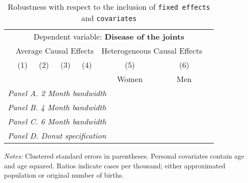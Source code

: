 \begin{table}[H] \begin{threeparttable} \centering \caption{Robustness with respect to the inclusion of \texttt{fixed effects} and \texttt{covariates}} {\def\sym#1{\ifmmode^{#1}\else\(^{#1}\)\fi} \begin{tabular}{l*{7}{c}} \toprule & \multicolumn{6}{c}{Dependent variable: \textbf{Disease of the joints}} \\ \cmidrule(lr){2-7}
            &\multicolumn{4}{c}{Average Causal Effects}         &\multicolumn{2}{c}{Heterogeneous Causal Effects}\\\cmidrule(lr){2-5}\cmidrule(lr){6-7}
            &\multicolumn{1}{c}{(1)}&\multicolumn{1}{c}{(2)}&\multicolumn{1}{c}{(3)}&\multicolumn{1}{c}{(4)}&\multicolumn{1}{c}{(5)}&\multicolumn{1}{c}{(6)}\\
            &\multicolumn{1}{c}{}&\multicolumn{1}{c}{}&\multicolumn{1}{c}{}&\multicolumn{1}{c}{}&\multicolumn{1}{c}{Women}&\multicolumn{1}{c}{Men}\\
\midrule
 \multicolumn{7}{l}{\emph{Panel A. 2 Month bandwidth}} \\    \midrule\multicolumn{7}{l}{\emph{Panel B. 4 Month bandwidth}} \\    \midrule\multicolumn{7}{l}{\emph{Panel C. 6 Month bandwidth}} \\    \midrule\multicolumn{7}{l}{\emph{Panel D. Donut specification}} \\    \midrule  
\bottomrule \end{tabular} } \begin{tablenotes} \item \scriptsize \emph{Notes:} Clustered standard errors in parentheses. Personal covariates contain age and age squared. Ratios indicate cases per thousand; either approximated population or original number of births. \end{tablenotes} \end{threeparttable} \end{table} 
